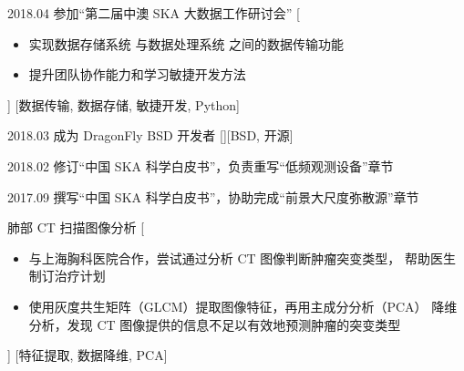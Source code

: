 \documentclass[zh]{resume}
\begin{document}
\begin{experiences}
  \experience
    {2018.04}%
    {参加\enquote{第二届中澳 SKA 大数据工作研讨会}}%
    [\begin{itemize}
      \item 实现数据存储系统
            与数据处理系统
            之间的数据传输功能
      \item 提升团队协作能力和学习敏捷开发方法
    \end{itemize}]%
    [数据传输, 数据存储, 敏捷开发, Python]

  \separator{0.5em}
  \experience
    {2018.03}%
    {成为 DragonFly BSD 开发者}%
    [][BSD, 开源]


  \separator{0.5em}
  \experience
    {2018.02}%
    {修订\enquote{中国 SKA 科学白皮书}，负责重写\enquote{低频观测设备}章节}


  \separator{0.5em}
  \experience
    {2017.09}%
    {撰写\enquote{中国 SKA 科学白皮书}，协助完成\enquote{前景大尺度弥散源}章节}

  \separator{0.5em}
    {肺部 CT 扫描图像分析}%
    [\begin{itemize}
      \item 与上海胸科医院合作，尝试通过分析 CT 图像判断肿瘤突变类型，
            帮助医生制订治疗计划
      \item 使用灰度共生矩阵（GLCM）提取图像特征，再用主成分分析（PCA）
            降维分析，发现 CT 图像提供的信息不足以有效地预测肿瘤的突变类型
    \end{itemize}]%
    [特征提取, 数据降维, PCA]



\end{experiences}
\end{document}
